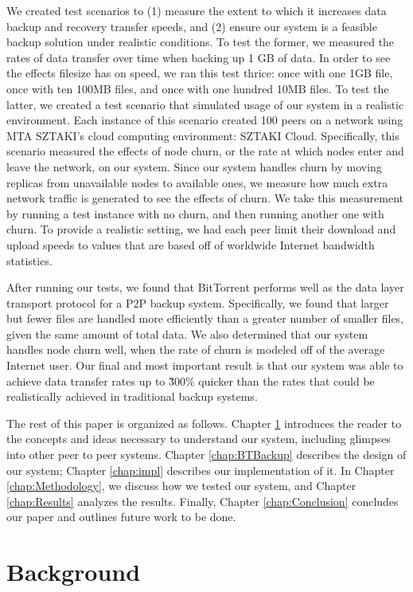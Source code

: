 \documentclass[12pt]{report}
\begin{document}
We created test scenarios to (1) measure the extent to which it increases data backup and recovery transfer speeds, and (2) ensure our system is a feasible backup solution under realistic conditions. To test the former, we measured the rates of data transfer over time when backing up 1 GB of data. In order to see the effects filesize has on speed, we ran this test thrice: once with one 1GB file, once with ten 100MB files, and once with one hundred 10MB files. To test the latter, we created a test scenario that simulated usage of our system in a realistic environment. Each instance of this scenario created 100 peers on a network using MTA SZTAKI's cloud computing environment: SZTAKI Cloud. Specifically, this scenario measured the effects of node churn, or the rate at which nodes enter and leave the network, on our system. Since our system handles churn by moving replicas from unavailable nodes to available ones, we measure how much extra network traffic is generated to see the effects of churn. We take this measurement by running a test instance with no churn, and then running another one with churn. To provide a realistic setting, we had each peer limit their download and upload speeds to values that are based off of worldwide Internet bandwidth statistics.

After running our tests, we found that BitTorrent performs well as the data layer transport protocol for a P2P backup system. Specifically, we found that larger but fewer files are handled more efficiently than a greater number of smaller files, given the same amount of total data. We also determined that our system handles node churn well, when the rate of churn is modeled off of the average Internet user. Our final and most important result is that our system was able to achieve data transfer rates up to \~300\% quicker than the rates that could be realistically achieved in traditional backup systems.

The rest of this paper is organized as follows. Chapter \ref{chap:Background} introduces the reader to the concepts and ideas necessary to understand our system, including glimpses into other peer to peer systems. Chapter \ref{chap:BTBackup} describes the design of our system; Chapter \ref{chap:impl} describes our implementation of it. In Chapter \ref{chap:Methodology}, we discuss how we tested our system, and Chapter \ref{chap:Results} analyzes the results. Finally, Chapter \ref{chap:Conclusion} concludes our paper and outlines future work to be done.

\chapter{Background} \label{chap:Background}
\end{document}
